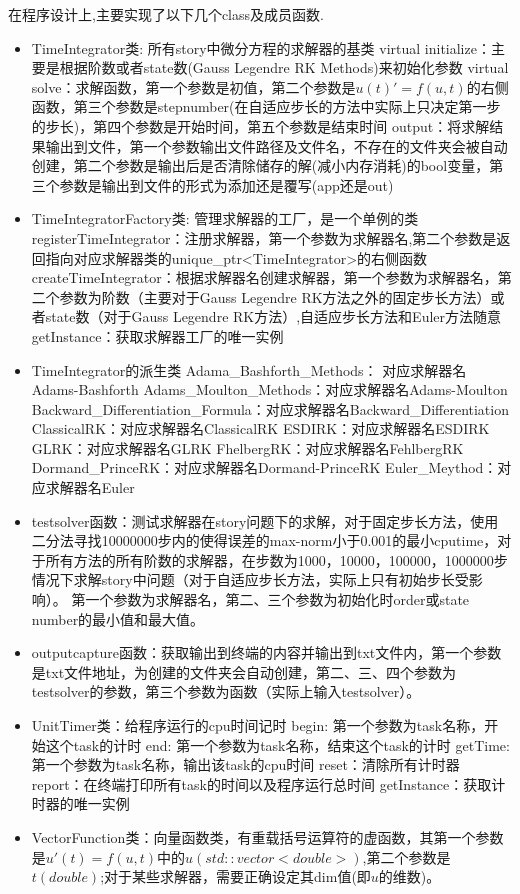 在程序设计上,主要实现了以下几个class及成员函数.
\begin{itemize}
  \item TimeIntegrator类: 所有story中微分方程的求解器的基类
  \subitem virtual initialize：主要是根据阶数或者state数(Gauss Legendre RK Methods)来初始化参数
  \subitem virtual solve：求解函数，第一个参数是初值，第二个参数是$u(t)'=f(u,t)$的右侧函数，第三个参数是stepnumber(在自适应步长的方法中实际上只决定第一步的步长)，第四个参数是开始时间，第五个参数是结束时间
  \subitem output：将求解结果输出到文件，第一个参数输出文件路径及文件名，不存在的文件夹会被自动创建，第二个参数是输出后是否清除储存的解(减小内存消耗)的bool变量，第三个参数是输出到文件的形式为添加还是覆写(app还是out)
  \item TimeIntegratorFactory类: 管理求解器的工厂，是一个单例的类
  \subitem registerTimeIntegrator：注册求解器，第一个参数为求解器名,第二个参数是返回指向对应求解器类的unique\_ptr<TimeIntegrator>的右侧函数
  \subitem createTimeIntegrator：根据求解器名创建求解器，第一个参数为求解器名，第二个参数为阶数（主要对于Gauss Legendre RK方法之外的固定步长方法）或者state数（对于Gauss Legendre RK方法）,自适应步长方法和Euler方法随意
  \subitem getInstance：获取求解器工厂的唯一实例
  \item TimeIntegrator的派生类
  \subitem Adama\_Bashforth\_Methods： 对应求解器名Adams-Bashforth
  \subitem Adams\_Moulton\_Methods：对应求解器名Adams-Moulton
  \subitem Backward\_Differentiation\_Formula：对应求解器名Backward\_Differentiation
  \subitem ClassicalRK：对应求解器名ClassicalRK
  \subitem ESDIRK：对应求解器名ESDIRK
  \subitem GLRK：对应求解器名GLRK
  \subitem FhelbergRK：对应求解器名FehlbergRK
  \subitem Dormand\_PrinceRK：对应求解器名Dormand-PrinceRK
  \subitem Euler\_Meythod：对应求解器名Euler
  \item testsolver函数：测试求解器在story问题下的求解，对于固定步长方法，使用二分法寻找10000000步内的使得误差的max-norm小于0.001的最小cputime，对于所有方法的所有阶数的求解器，在步数为1000，10000，100000，1000000步情况下求解story中问题（对于自适应步长方法，实际上只有初始步长受影响）。
  第一个参数为求解器名，第二、三个参数为初始化时order或state number的最小值和最大值。
  \item outputcapture函数：获取输出到终端的内容并输出到txt文件内，第一个参数是txt文件地址，为创建的文件夹会自动创建，第二、三、四个参数为testsolver的参数，第三个参数为函数（实际上输入testsolver）。
  \item UnitTimer类：给程序运行的cpu时间记时
  \subitem begin: 第一个参数为task名称，开始这个task的计时
  \subitem end: 第一个参数为task名称，结束这个task的计时
  \subitem getTime: 第一个参数为task名称，输出该task的cpu时间
  \subitem reset：清除所有计时器
  \subitem report：在终端打印所有task的时间以及程序运行总时间
  \subitem getInstance：获取计时器的唯一实例
  \item VectorFunction类：向量函数类，有重载括号运算符的虚函数，其第一个参数是$u'(t)=f(u,t)$中的$u(std::vector<double>)$,第二个参数是$t(double)$;对于某些求解器，需要正确设定其dim值(即$u$的维数)。
\end{itemize}

